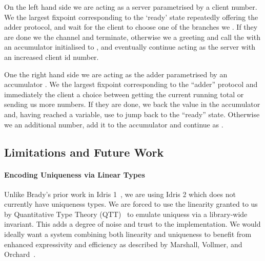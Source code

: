 \documentclass{easychair}
\begin{document}
\noindent\begin{minipage}[t]{.49\textwidth}
\end{minipage}\hfill
\begin{minipage}[t]{.49\textwidth}
\end{minipage}

On the left hand side we are acting as a server parametrised by a client
 number. We  the largest fixpoint
corresponding to the `ready' state repeatedly offering the adder protocol,
and wait for the client to choose one of the branches we .
If they are done we  the channel and terminate,
otherwise we  a greeting and call the
 with an accumulator initialised to ,
and eventually continue acting as the server with an increased client id number.

One the right hand side we are acting as the adder parametrised by an
accumulator . We  the largest
fixpoint corresponding to the ``adder'' protocol and immediately
 the client a choice between getting the current
running total or sending us more numbers.
%
If they are done, we  back the value in the accumulator
and, having reached a  variable, use  to
jump back to the ``ready'' state.
%
Otherwise we  an additional number,
add it to the accumulator and continue as .

\subsection*{Limitations and Future Work}

\paragraph{Encoding Uniqueness via Linear Types}
Unlike Brady's prior work in Idris 1~\cite{DBLP:journals/aghcs/Brady17},
we are using Idris 2 which does not currently have uniqueness types.
We are forced to use the linearity granted to us by
Quantitative Type Theory (QTT)~\cite{DBLP:conf/birthday/McBride16,DBLP:conf/lics/Atkey18}
to emulate uniquess via a library-wide invariant.
%
This adds a degree of noise and trust to the implementation.
We would ideally want a system combining both linearity and uniqueness
to benefit from enhanced expressivity and efficiency as described
by Marshall, Vollmer, and Orchard~\cite{DBLP:conf/esop/MarshallVO22}.
\end{document}
